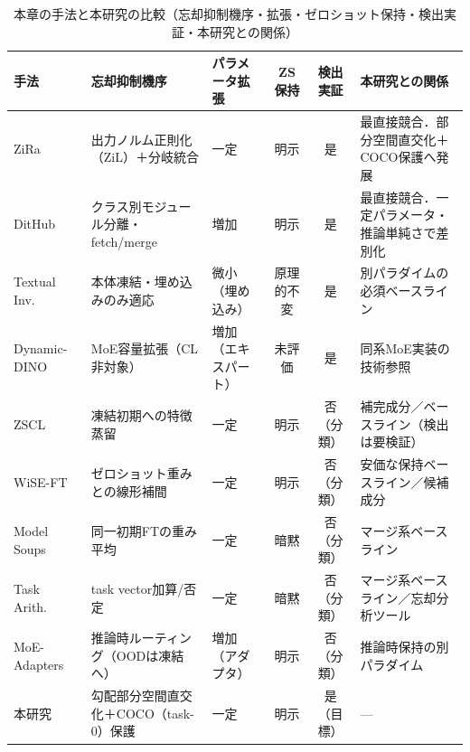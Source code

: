 \begin{table}[tb]
\caption{本章の手法と本研究の比較（忘却抑制機序・拡張・ゼロショット保持・検出実証・本研究との関係）}
\label{tab:vlm-ovd-compare}
\scriptsize
\begin{tabularx}{\linewidth}{l l l c c X}
\hline
手法 & 忘却抑制機序 & パラメータ拡張 & ZS保持 & 検出実証 & 本研究との関係 \\
\hline
ZiRa~\cite{zira} & 出力ノルム正則化（ZiL）＋分岐統合 & 一定 & 明示 & 是 & 最直接競合．部分空間直交化＋COCO保護へ発展 \\
DitHub~\cite{dithub} & クラス別モジュール分離・fetch/merge & 増加 & 明示 & 是 & 最直接競合．一定パラメータ・推論単純さで差別化 \\
Textual Inv.~\cite{textinv} & 本体凍結・埋め込みのみ適応 & 微小（埋め込み） & 原理的不変 & 是 & 別パラダイムの必須ベースライン \\
Dynamic-DINO~\cite{dynamicdino} & MoE容量拡張（CL非対象） & 増加（エキスパート） & 未評価 & 是 & 同系MoE実装の技術参照 \\
ZSCL~\cite{zscl} & 凍結初期への特徴蒸留 & 一定 & 明示 & 否（分類） & 補完成分／ベースライン（検出は要検証） \\
WiSE-FT~\cite{wiseft} & ゼロショット重みとの線形補間 & 一定 & 明示 & 否（分類） & 安価な保持ベースライン／候補成分 \\
Model Soups~\cite{modelsoups} & 同一初期FTの重み平均 & 一定 & 暗黙 & 否（分類） & マージ系ベースライン \\
Task Arith.~\cite{taskarith} & task vector加算/否定 & 一定 & 暗黙 & 否（分類） & マージ系ベースライン／忘却分析ツール \\
MoE-Adapters~\cite{moeadapters} & 推論時ルーティング（OODは凍結へ） & 増加（アダプタ） & 明示 & 否（分類） & 推論時保持の別パラダイム \\
\hline
本研究 & 勾配部分空間直交化＋COCO（task-0）保護 & 一定 & 明示 & 是（目標） & --- \\
\hline
\end{tabularx}
\end{table}
